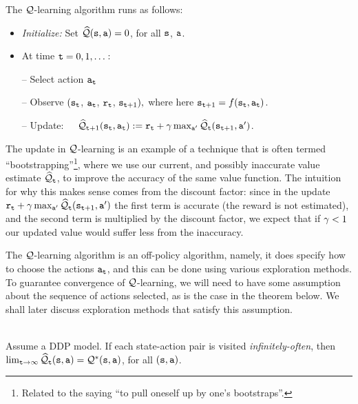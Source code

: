 The $\mathcal{Q}$-learning algorithm runs as follows:
\begin{itemize}
\item {\em Initialize:} Set $\widehat{\mathcal{Q}}({\tt s},{\tt a})=0$, for all ${\tt s}$, ${\tt a}$.
\item At time ${\tt t}=0,1,\dots$:

-- Select action ${\tt a}_{\tt t}$

-- Observe $({\tt s}_{\tt t}$, ${\tt a}_{\tt t}$, ${\tt r}_{\tt t}$,
${\tt s}_{{\tt t}+1}),$
where here ${\tt s}_{{\tt t}+1}=f({\tt s}_{\tt t},{\tt a}_{\tt t})$.

-- Update:\ \ \
$\widehat{\mathcal{Q}}_{{\tt t}+1}({\tt s}_{\tt t},{\tt a}_{\tt t}) :=
{\tt r}_{\tt t}+\gamma \max_{{\tt a}'}
\widehat{\mathcal{Q}}_{\tt t}({\tt s}_{{\tt t}+1},{\tt a}')$.
\end{itemize}

The update in $\mathcal{Q}$-learning is an example of a technique that is often termed ``bootstrapping''\footnote{Related to the saying ``to pull oneself up by one's bootstraps''.}, where we use our current, and possibly inaccurate value estimate $\widehat{\mathcal{Q}}_{\tt t}$, to improve the accuracy of the same value function. The intuition for why this makes sense comes from the discount factor: since in the update ${\tt r}_{\tt t}+\gamma \max_{{\tt a}'}
\widehat{\mathcal{Q}}_{\tt t}({\tt s}_{{\tt t}+1},{\tt a}')$ the first term is accurate (the reward is not estimated), and the second term is multiplied by the discount factor, we expect that if $\gamma<1$ our updated value would suffer less from the inaccuracy. 

The $\mathcal{Q}$-learning algorithm is an off-policy algorithm, namely, it does specify how to choose the actions
${\tt a}_{\tt t}$, and this can be done using various exploration methods.
To guarantee convergence of $\mathcal{Q}$-learning, we will need to have some assumption about the
sequence of actions selected, as is the case in the theorem below. We shall later discuss exploration methods that satisfy this assumption.

\begin{theorem}\ \\
Assume a DDP model.
If each state-action pair is visited {\em infinitely-often}, then
$\lim_{{\tt t}\to\infty}\widehat{\mathcal{Q}}_{\tt t}({\tt s},{\tt a})=\mathcal{Q}^*({\tt s},{\tt a})$,
for all $({\tt s},{\tt a})$.
\end{theorem}

